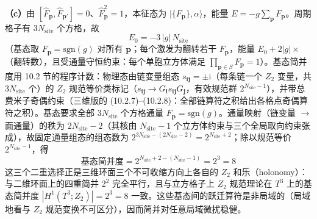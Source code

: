 \textbf{（c）}由 $[\hat F_{\pmb p},\hat F_{\pmb p'}]=0$、$\hat F_{\pmb p}^{2}=1$，本征态为 $|\{F_{\pmb p}\},\alpha\rangle$，能量 $E=-g\sum_{\pmb p}F_{\pmb p}$。周期格子有 $3N_{\text{site}}$ 个方格，故
\begin{equation*}
\boxed{\;E_{0}=-3\,|g|\,N_{\text{site}}\;}
\end{equation*}
（基态取 $F_{\pmb p}=\mathrm{sgn}(g)$ 对所有 $\pmb p$；每个激发为翻转若干 $F_{\pmb p}$，能量 $E_0+2|g|\times$（翻转数），且受通量守恒约束：每个单胞立方体满足 $\prod_{\pmb p\in S}F_{\pmb p}=1$）。基态简并度用 10.2 节的程序计数：物理态由链变量组态 $s_{\pmb{i}\pmb j}=\pm\mathrm i$（每条链一个 $Z_2$ 变量，共 $3N_{\text{site}}$ 个）的 $Z_2$ 规范等价类标记（$s_{\pmb{i}\pmb j}\to G_{\pmb i}s_{\pmb{i}\pmb j}G_{\pmb j}$，有效规范群 $2^{N_{\text{site}}-1}$），并带总费米子奇偶约束（三维版的 (10.2.7)--(10.2.8)：全部链算符之积给出各格点奇偶算符之积）。基态要求全部 $3N_{\text{site}}$ 个方格通量 $F_{\pmb p}=\mathrm{sgn}(g)$。通量映射（链变量 $\to$ 面通量）的秩为 $2N_{\text{site}}-2$（其核由 $N_{\text{site}}-1$ 个立方体约束与三个全局取向约束张成），故固定通量组态的组态数为 $2^{3N_{\text{site}}-(2N_{\text{site}}-2)}=2^{N_{\text{site}}+2}$；除以规范等价 $2^{N_{\text{site}}-1}$，得
\begin{equation*}
\boxed{\;\text{基态简并度}=2^{N_{\text{site}}+2-(N_{\text{site}}-1)}=2^{3}=8\;}
\end{equation*}
这三个二重选择正是三维环面三个不可收缩方向上各自的 $Z_2$ 和乐（holonomy）：与二维环面上的四重简并 $2^2$ 完全平行，且与立方格子上 $Z_2$ 规范理论在 $T^3$ 上的基态简并度 $|H^1(T^3;Z_2)|=2^3=8$ 一致。这些基态间的跃迁算符是非局域的（局域地看与 $Z_2$ 规范变换不可区分），因而简并对任意局域微扰稳健。

